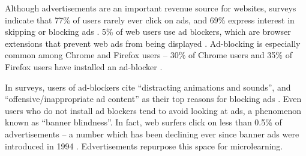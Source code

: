 \documentclass{sigchi}
\begin{document}
Although advertisements are an important revenue source for websites, surveys indicate that 77\% of users rarely ever click on ads, and 69\% express interest in skipping or blocking ads \cite{adblockinggames}.
5\% of web users use ad blockers, which are browser extensions that prevent web ads from being displayed \cite{adblockinggoesmainstream}. Ad-blocking is especially common among Chrome and Firefox users -- 30\% of Chrome users and 35\% of Firefox users have installed an ad-blocker \cite{adblockinggoesmainstream}.


In surveys, users of ad-blockers cite ``distracting animations and sounds'', and ``offensive/inappropriate ad content'' as their top reasons for blocking ads \cite{adblockinggames}. Even users who do not install ad blockers tend to avoid looking at ads, a phenomenon known as ``banner blindness''. In fact, web surfers click on less than 0.5\% of advertisements -- a number which has been declining ever since banner ads were introduced in 1994 \cite{whypeopleavoidadvertising}. Edvertisements repurpose this space for microlearning.


\end{document}
